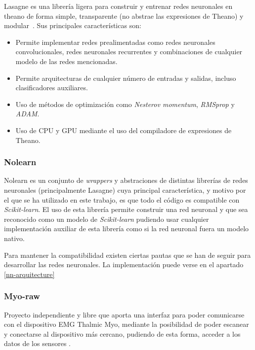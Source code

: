 Lasagne es una librería ligera para construir y entrenar redes neuronales en theano de forma simple, transparente (no abstrae las expresiones de Theano) y modular~\cite{lasagne}. Sus principales características son:

\begin{itemize}

	\item Permite implementar redes prealimentadas como redes neuronales convolucionales, redes neuronales recurrentes y combinaciones de cualquier modelo de las redes mencionadas.
	\item Permite arquitecturas de cualquier número de entradas y salidas, incluso clasificadores auxiliares.
	\item Uso de métodos de optimización como \textit{Nesterov momentum}, \textit{RMSprop} y \textit{ADAM}.
	\item Uso de CPU y GPU mediante el uso del compiladore de expresiones de Theano.
\end{itemize}



\subsubsection{Nolearn}
\label{subs:nolearn}

Nolearn \cite{nolearn} es un conjunto de \textit{wrappers} y abstraciones de distintas librerías de redes neuronales (principalmente Lasagne) cuya principal característica, y motivo por el que se ha utilizado en este trabajo, es que todo el código es compatible con \textit{Scikit-learn}. El uso de esta librería permite construir una red neuronal y que sea reconocido como un modelo de \textit{Scikit-learn} pudiendo usar cualquier implementación auxiliar de esta librería como si la red neuronal fuera un modelo nativo.

Para mantener la compatibilidad existen ciertas pautas que se han de seguir para desarrollar las redes neuronales. La implementación puede verse en el apartado \ref{nn-arquitecture}



\subsubsection{Myo-raw}
\label{subs:myo-raw}

Proyecto independiente y libre que aporta una interfaz para poder comunicarse
con el dispositivo EMG Thalmic Myo, mediante la posibilidad de poder escanear
y conectarse al dispositivo más cercano, pudiendo de esta forma, acceder a los
datos de los sensores \cite{myo-raw}.

